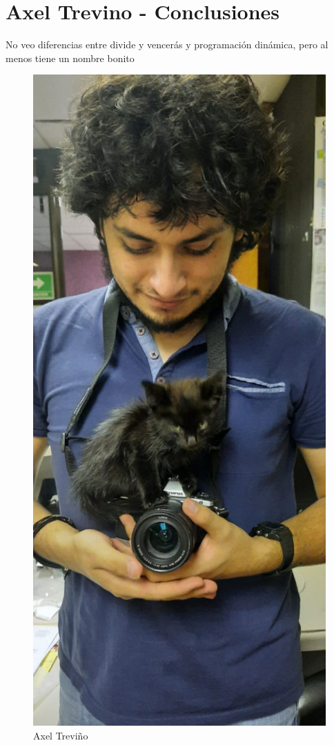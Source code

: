 \newpage
\section{Axel Trevino - Conclusiones}
    No veo diferencias entre divide y vencerás y programación dinámica, pero al menos tiene un nombre bonito
    \begin{figure}[htp!]
            \centering
            \includegraphics[width=0.4 \textwidth]{Images/Fotos_Alumnos/axel.jpg}  
            \caption{Axel Treviño}
            \label{fig:my_label2}
        \end{figure}
